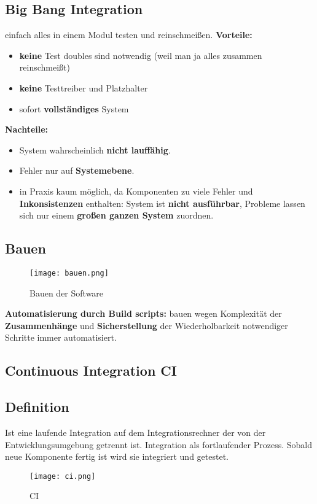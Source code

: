 \documentclass{book}
\begin{document}
    \subsection{Big Bang Integration}
    einfach alles in einem Modul testen und reinschmeißen.
    \newline
    \textbf{Vorteile:}
    \begin{itemize}
        \item \textbf{keine} Test doubles sind notwendig (weil man ja alles zusammen reinschmeißt)
        \item \textbf{keine} Testtreiber und Platzhalter
        \item sofort \textbf{vollständiges} System
    \end{itemize}
    \textbf{Nachteile:}
    \begin{itemize}
        \item System wahrscheinlich \textbf{nicht lauffähig}.
        \item Fehler nur auf \textbf{Systemebene}.
        \item in Praxis kaum möglich, da Komponenten zu viele Fehler und \textbf{Inkonsistenzen} enthalten: \newline System ist \textbf{nicht ausführbar}, Probleme lassen sich nur einem \textbf{großen ganzen System} zuordnen.
        \clearpage
    \end{itemize}
    \subsection{Bauen}
    \begin{figure}[H]
        \centering
        \texttt{[image: bauen.png]}
        \caption{Bauen der Software}

        \label{fig:enter-label}
    \end{figure}
    \textbf{Automatisierung durch Build scripts:} bauen wegen Komplexität der \textbf{Zusammenhänge} und \textbf{Sicherstellung} der Wiederholbarkeit notwendiger Schritte immer automatisiert.

    \subsection{Continuous Integration CI}
    \subsection{Definition}
    Ist eine laufende Integration auf dem Integrationsrechner der von der Entwicklungsumgebung getrennt ist. Integration als fortlaufender Prozess. Sobald neue Komponente fertig ist wird sie integriert und getestet.
    \begin{figure}[H]
        \centering
        \texttt{[image: ci.png]}
        \caption{CI}
        \label{fig:enter-label}
    \end{figure}
    \clearpage
\end{document}
